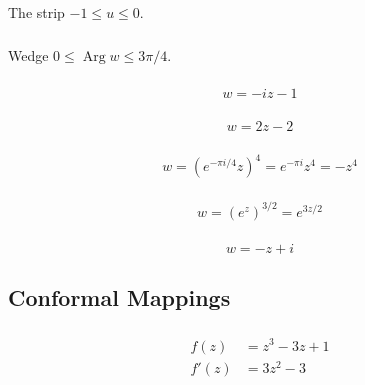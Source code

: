 \documentclass{article}
\newcommand{\Arg}{\operatorname{Arg}}
\begin{document}
The strip $-1 \le u \le 0$.

\setcounter{subsubsection}{18}
\subsubsection{}

Wedge $0 \le \Arg w \le 3 \pi / 4$.

\setcounter{subsubsection}{20}
\subsubsection{}

\[w = -i z - 1\]

\setcounter{subsubsection}{22}
\subsubsection{}

\[w = 2 z - 2\]

\setcounter{subsubsection}{24}
\subsubsection{}

\[w = (e^{-\pi i / 4} z)^4 = e^{-\pi i} z^4 = -z^4\]

\setcounter{subsubsection}{26}
\subsubsection{}

\[w = (e^z)^{3 / 2} = e^{3 z / 2}\]

\setcounter{subsubsection}{28}
\subsubsection{}

\[w = -z + i\]

\subsection{Conformal Mappings}

\subsubsection{}

\begin{align*}
  f(z)  & = z^3 - 3 z + 1 \\
  f'(z) & = 3 z^2 - 3
\end{align*}
\end{document}
